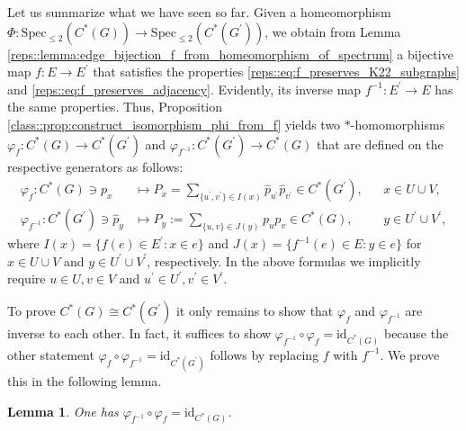 \documentclass[a4paper]{amsart}
\newtheorem{lemma}[thm]{Lemma}
\begin{document}
Let us summarize what we have seen so far. Given a homeomorphism $\Phi: \mathrm{Spec}_{\leq 2}(C^\ast(G)) \to \mathrm{Spec}_{\leq 2}(C^\ast(G^\prime))$, we obtain from Lemma \ref{reps::lemma:edge_bijection_f_from_homeomorphism_of_spectrum} a bijective map $f: E \to E^\prime$ that satisfies the properties \eqref{reps::eq:f_preserves_K22_subgraphs} and \eqref{reps::eq:f_preserves_adjacency}. Evidently, its inverse map $f^{-1}: E^\prime \to E$ has the same properties. Thus, Proposition \ref{class::prop:construct_isomorphism_phi_from_f} yields two $\ast$-homomorphisms $\varphi_f: C^\ast(G) \to C^\ast(G^\prime)$ and $\varphi_{f^{-1}}: C^\ast(G^\prime) \to C^\ast(G)$ that are defined on the respective generators as follows:
\begin{align}
    \label{class::eq:phi_on_generators}
    \varphi_f: C^\ast(G) \ni p_x &\mapsto P_x = \sum_{\{u^\prime, v^\prime\} \in I(x)} \hat{p}_{u^\prime} \hat{p}_{v^\prime} \in C^\ast(G^\prime), & & x \in U \cup V, \\
    \label{class::eq:psi_on_generators}
    \varphi_{f^{-1}}: C^\ast(G^\prime) \ni \hat{p}_y &\mapsto \hat{P}_y := \sum_{\{u, v\} \in J(y)} p_u p_v \in C^\ast(G), & & y \in U^\prime \cup V^\prime,
\end{align}
where $I(x) = \{f(e) \in E^\prime: x \in e\}$ and $J(x) = \{f^{-1}(e) \in E: y \in e\}$ for $x \in U \cup V$ and $y \in U^\prime \cup V^\prime$, respectively. In the above formulas we implicitly require $u \in U, v \in V$ and $u^\prime \in U^\prime, v^\prime \in V^\prime$.

To prove $C^\ast(G) \cong C^\ast(G^\prime)$ it only remains to show that $\varphi_f$ and $\varphi_{f^{-1}}$ are inverse to each other. In fact, it suffices to show $\varphi_{f^{-1}} \circ \varphi_f = \mathrm{id}_{C^\ast(G)}$ because the other statement $\varphi_f \circ \varphi_{f^{-1}} = \mathrm{id}_{C^\ast(G^\prime)}$ follows by replacing $f$ with $f^{-1}$. We prove this in the following lemma.

\begin{lemma} 
    \label{class::lemma:phi_is_invertible}
    One has $\varphi_{f^{-1}} \circ \varphi_f = \mathrm{id}_{C^\ast(G)}$.
\end{lemma}
\end{document}
